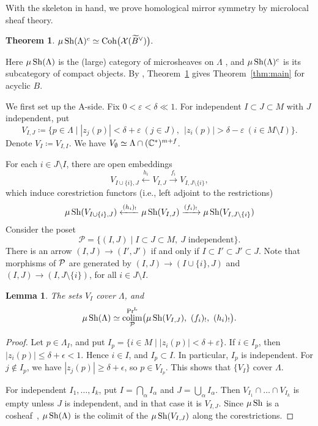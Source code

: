 \documentclass[12pt, letter]{amsart}
\newtheorem{lemma}[dummy]{Lemma}
\newtheorem{theorem}[dummy]{Theorem}
\theoremstyle{definition}
\begin{document}
With the skeleton in hand, we prove homological mirror symmetry by microlocal sheaf theory.

\begin{theorem}\label{thm:acyclic-skeletal-hms}
\(
 \mu\operatorname{Sh}(\Lambda)^c \simeq\operatorname{Coh}\bigl(\mathcal{X}(\widetilde B^\vee)\bigr).
\)
\end{theorem}

Here $\mu\operatorname{Sh}(\Lambda)$ is the  (large) category of microsheaves on $\Lambda$ \cite{NS}, and $\mu\operatorname{Sh}(\Lambda)^c$ is its subcategory of compact objects. 
By \cite{NZ, GPS3}, Theorem~\ref{thm:acyclic-skeletal-hms} gives Theorem~\ref{thm:main} for acyclic $B$.








We first set up the A-side.
Fix $0<\varepsilon<\delta\ll 1$.
For independent $I\subset J \subset M$ with \(J\) independent, put
\[
 V_{I, J} \coloneqq \bigl\{p\in\Lambda \mid |z_j(p)|<\delta+\varepsilon\ (j\in J),\ \ |z_i(p)|>\delta-\varepsilon\ (i\in M\setminus I)\bigr\}.
\]
Denote \(V_I \coloneqq V_{I, I}\). 
We have \( V_{\emptyset} \simeq \Lambda \cap (\mathbb{C}^*)^{m+f}\). 



For each $i\in J\setminus I$, there are open embeddings
\[
 V_{I\cup\{i\},J}\xleftarrow{\ h_i\ }V_{I,J}\xrightarrow{\ f_i\ }V_{I,J\setminus\{i\}},
\]
which induce corestriction functors (i.e., left adjoint to the restrictions)
\[
\mu\operatorname{Sh}(V_{I\cup\{i\},J})
\xleftarrow{(h_i)_!}
\mu\operatorname{Sh}(V_{I,J})
\xrightarrow{(f_i)_!}
\mu\operatorname{Sh}(V_{I,J\setminus\{i\}}) 
\]
Consider the poset
\[
\mathcal P=\{(I,J) \mid I\subset J\subset M,\ J\text{ independent}\}. 
\]
There is an arrow \( (I, J) \to (I', J')\) if and only if \(I \subset I' \subset J'\subset J\). 
Note that 
morphisms of \(\mathcal{P}\) are generated by \( (I, J) \to (I \cup \{i\}, J)\) and \( (I, J) \to (I, J\setminus \{i\} )\), for all \(i \in J\setminus I\).  

\begin{lemma}\label{lem:acyclic-microlocal}
    The sets $V_{I}$ cover $\Lambda$, and
\[
 \mu\Sh(\Lambda)\simeq\operatorname*{colim}^{\mathrm{Pr}^\mathrm{L}}_{\cP}\bigl(\mu\Sh(V_{I,J}),\ (f_i)_!,\ (h_i)_!\bigr).
\]
\end{lemma}

\begin{proof}
Let $p\in\Lambda_{I}$, and put 
$I_p=\{i\in M\mid |z_i(p)|<\delta+\varepsilon\}$. If \(i\in I_p\), then \(|z_i(p)| \le \delta + \epsilon < 1\). Hence \(i\in I\), and \(I_p \subset I\). In particular, \(I_p\) is independent. For \(j \notin I_p\), we have \(|z_j(p)| \ge \delta + \epsilon\), so \(p\in V_{I_p}\). This shows that \(\{V_I\}\) cover \(\Lambda\). 



For independent $I_1,\dots,I_k$, put $I=\bigcap_\alpha I_\alpha$ and $J=\bigcup_\alpha I_\alpha$.
Then $V_{I_1}\cap\dots\cap V_{I_k}$ is empty unless $J$ is independent, and in that case it is $V_{I,J}$.
Since $\mu\operatorname{Sh}$ is a cosheaf~\cite{NS}, $\mu\operatorname{Sh}(\Lambda)$ is the colimit of the $\mu\operatorname{Sh}(V_{I,J})$ along the corestrictions.
\end{proof}
\end{document}
